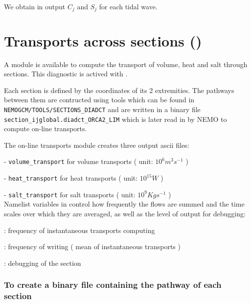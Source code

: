 \documentclass[NEMO_book]{subfiles}
\begin{document}
We obtain in output $C_{j}$ and $S_{j}$ for each tidal wave.

\section{Transports across sections () }
\label{DIA_diag_dct}

A module is available to compute the transport of volume, heat and salt through sections. 
This diagnostic is actived with .

Each section is defined by the coordinates of its 2 extremities. The pathways between them are contructed
using tools which can be found in  \texttt{NEMOGCM/TOOLS/SECTIONS\_DIADCT} and are written in a binary file
 \texttt{section\_ijglobal.diadct\_ORCA2\_LIM} which is later read in by NEMO to compute on-line transports.

The on-line transports module creates three output ascii files: 

- \texttt{volume\_transport} for volume transports (  unit: $10^{6} m^{3} s^{-1}$ )

- \texttt{heat\_transport}   for heat transports   (  unit: $10^{15} W $ )

- \texttt{salt\_transport}   for salt transports   (  unit: $10^{9}Kg s^{-1}$ )\\


Namelist variables in  control how frequently the flows are summed 
and the time scales over which they are averaged, as well as the level of output for debugging:


: frequency of instantaneous transports computing

: frequency of writing ( mean of instantaneous transports )

: debugging of the section

\subsubsection{ To create a binary file containing the pathway of each section }
\end{document}
